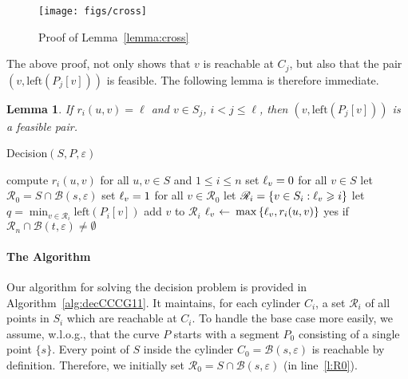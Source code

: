 \documentclass[12pt]{dalthesis}
\newtheorem{lemma}[theorem]{Lemma}
\newcommand{\lee}{\leqslant}
\newcommand{\gee}{\geqslant}
\newcommand{\set}[1]{{\{ #1 \}}}
\newcommand{\eps}{\varepsilon}
\newcommand{\eq}{{\ \leftarrow\ }}
\newcommand{\CR}{{\mathscr R}}
\newcommand{\CB}{{\mathscr B}}
\newcommand{\Left}{\mbox{left}}
\newcommand{\Right}{\mbox{right}}
\newcommand{\R}{\CR}
\newcommand{\lex}{\preceq}
\newcommand{\ri}{r}
\begin{document}
\begin{figure}[t]
	\centering
	\texttt{[image: figs/cross]}
	\vspace{0.5em}
	\caption{Proof of Lemma~\ref{lemma:cross}}
	\label{fig:cross}
\end{figure}

The above proof, not only shows that 
$v$ is reachable at $C_j$, 
but also that 
the pair $(v, \Left(P_j[v]))$ is feasible.
The following lemma is therefore immediate.

\begin{lemma} \label{lemma:left-point}
	If $\ri_i(u,v) = \ell$ and $v \in S_j$, $i < j \lee \ell$,
	then $(v, \Left(P_j[v]))$ is a feasible pair.
\end{lemma}





\begin{algorithm} [h]
\caption {{\sc Decision}$(S, P, \eps)$} 
\label{alg:decCCCG11}
\begin{algorithmic}[1]
	\vspace{0.5em}
	\baselineskip
{}  \label{l:init}
		\STATE \hspace{1.5em}compute $\ri_i(u,v)$ for all $u,v \in S$ and $1 \lee i \lee n$ \label{l:init-1} 
		\STATE \hspace{1.5em}set $\ell_{v} = 0$ for all $v \in S$ \label{l:init-2} 
		\STATE \hspace{1.5em}let $\R_0 = S \cap \CB(s,\eps)$ \label{l:R0} \label{l:init-3} 
		\STATE \hspace{1.5em}set $\ell_v = 1$ for all $v \in \R_0$  \label{l:init-4} 
	   \label{l:mainstart}
		\STATE let $\R_i = \set{v \in S_{i} : \re_{v}\gee i}$  \label{l:direct}
		\STATE let $q = \min_{v \in \R_i}{\Left(P_i[v])}$  \label{l:min}
		\FORALL {$v \in S_i \setminus \R_i$} \label{l:loop1start}
			\IF {$q \lex \Right(P_i[v])$} \label{l:cond}
				\STATE add $v$ to $\R_{i}$ \label{l:reach}
			\ENDIF
		\ENDFOR \label{l:loop1end}
		\FORALL {$(u,v) \in \R_{i} \times S$}  \label{l:rel-1}
				\STATE $\re_{v} \eq \max\set{\re_v, \ri_i(u,v)}$  \label{l:rel-2}
		\ENDFOR
	\ENDFOR 
	 {\sc yes} if $\R_n \cap \CB(t,\eps) \not= \emptyset$ \label{l:final}

\end{algorithmic}
\end{algorithm}

\paragraph{The Algorithm}
Our algorithm for solving the decision problem is provided in Algorithm~\ref{alg:decCCCG11}.
It maintains,
for each cylinder $C_i$, a set $\R_i$ of all points in $S_i$ which are reachable at $C_i$.
To handle the base case more easily,
we assume, w.l.o.g., that the curve $P$ starts with a segment $P_0$  
consisting of a single point $\set{s}$.
Every point of $S$ inside the cylinder $C_0 = \CB(s,\eps)$ is reachable by definition.
Therefore, we initially set $\R_0 = S \cap \CB(s,\eps)$ (in line~\ref{l:R0}).
\end{document}
